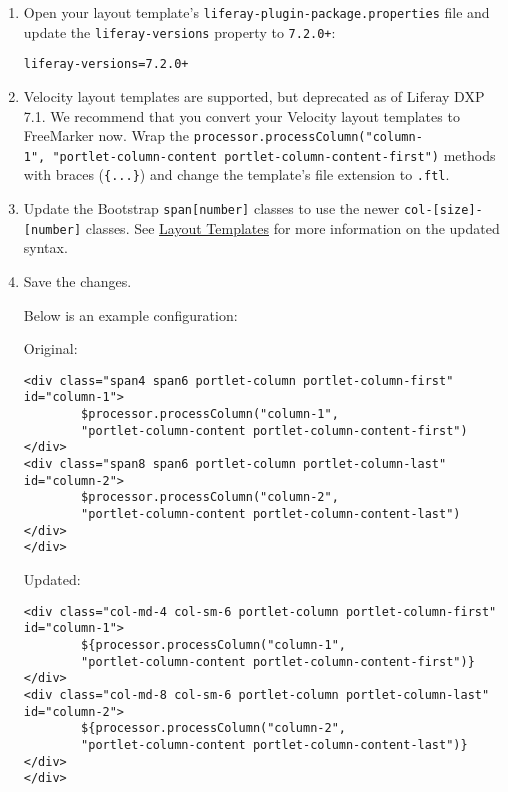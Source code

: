\begin{enumerate}
\def\labelenumi{\arabic{enumi}.}
\item
  Open your layout template's \texttt{liferay-plugin-package.properties}
  file and update the \texttt{liferay-versions} property to
  \texttt{7.2.0+}:

\begin{verbatim}
liferay-versions=7.2.0+
\end{verbatim}
\item
  Velocity layout templates are supported, but deprecated as of Liferay
  DXP 7.1. We recommend that you convert your Velocity layout templates
  to FreeMarker now. Wrap the
  \texttt{processor.processColumn("column-1",\ "portlet-column-content\ portlet-column-content-first")}
  methods with braces (\texttt{\{...\}}) and change the template's file
  extension to \texttt{.ftl}.
\item
  Update the Bootstrap \texttt{span{[}number{]}} classes to use the
  newer \texttt{col-{[}size{]}-{[}number{]}} classes. See
  \href{/docs/7-2/frameworks/-/knowledge_base/f/layout-templates-intro}{Layout
  Templates} for more information on the updated syntax.
\item
  Save the changes.

  Below is an example configuration:

  Original:

\begin{verbatim}
<div class="span4 span6 portlet-column portlet-column-first" 
id="column-1">
        $processor.processColumn("column-1", 
        "portlet-column-content portlet-column-content-first")
</div>
<div class="span8 span6 portlet-column portlet-column-last" 
id="column-2">
        $processor.processColumn("column-2", 
        "portlet-column-content portlet-column-content-last")
</div>
</div>
\end{verbatim}

  Updated:

\begin{verbatim}
<div class="col-md-4 col-sm-6 portlet-column portlet-column-first" 
id="column-1">
        ${processor.processColumn("column-1", 
        "portlet-column-content portlet-column-content-first")}
</div>
<div class="col-md-8 col-sm-6 portlet-column portlet-column-last" 
id="column-2">
        ${processor.processColumn("column-2", 
        "portlet-column-content portlet-column-content-last")}
</div>
</div>
\end{verbatim}
\end{enumerate}

